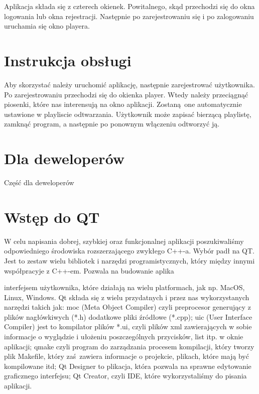 \documentclass{article}
\begin{document}
 Aplikacja składa się z czterech okienek. Powitalnego, skąd przechodzi się do okna logowania lub okna rejestracji. Następnie po zarejestrowaniu się i po zalogowaniu uruchamia się okno playera.
 

\section{Instrukcja obsługi}
 
 Aby skorzystać należy uruchomić aplikację, następnie zarejestrować użytkownika. Po zarejestrowaniu przechodzi się do okienka player. Wtedy należy przeciągnąć piosenki, które nas interensują na okno aplikacji. Zostaną one automatycznie ustawione w playliscie odtwarzania. Użytkownik może zapisać bierzącą playlistę, zamknąć program, a następnie po ponownym włączeniu odtworzyć ją.

\section*{Dla deweloperów}
 
Część dla deweloperów

\section{Wstęp do QT}
 
W celu napisania dobrej, szybkiej oraz funkcjonalnej aplikacji poszukiwaliśmy odpowiedniego środowiska rozszerzającego zwykłego C++-a. Wybór padł na QT. Jest to zestaw wielu bibliotek i narzędzi programistycznych, który między innymi współpracyje z C++-em. Pozwala na budowanie aplika

\secgraficznym interfejsem użytkownika, które działają na wielu platformach, jak np. MacOS, Linux, Windows. Qt składa się z wielu przydatnych i przez nas wykorzystanych narzędzi takich jak: moc (Meta Object Compiler) czyli preprocesor generujący z plików nagłówkiwych (*.h) dodatkowe pliki źródłowe (*.cpp); uic (User Interface Compiler) jest to kompilator plików *.ui, czyli plików xml zawierających w sobie informacje o wyglądzie i ułożeniu poszczególnych przycisków, list itp. w oknie aplikacji; qmake czyli program do zarządzania procesem kompilacji, który tworzy plik Makefile, który zaś zawiera informacje o projekcie, plikach, które mają być kompilowane itd; Qt Designer to plikacja, która pozwala na sprawne edytowanie graficznego interfejsu; Qt Creator, czyli IDE, które wykorzystaliśmy do pisania aplikacji.
\end{document}
